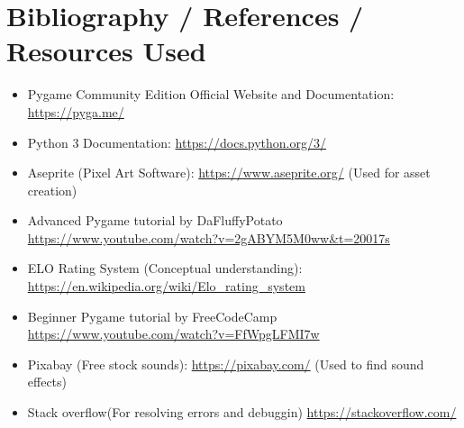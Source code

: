 \documentclass[11pt, a4paper]{article}
\begin{document}
\newpage


\section*{Bibliography / References / Resources Used}

\begin{itemize}

    \item Pygame Community Edition Official Website and Documentation: \href{https://pyga.me/}{https://pyga.me/}
    
    \item Python 3 Documentation: \href{https://docs.python.org/3/}{https://docs.python.org/3/}
    
    \item Aseprite (Pixel Art Software): \href{https://www.aseprite.org/}{https://www.aseprite.org/} (Used for asset creation)
    
    \item Advanced Pygame tutorial by DaFluffyPotato \url{https://www.youtube.com/watch?v=2gABYM5M0ww&t=20017s}
    
    \item ELO Rating System (Conceptual understanding): \href{https://en.wikipedia.org/wiki/Elo_rating_system}{https://en.wikipedia.org/wiki/Elo\_rating\_system}
        
    \item Beginner Pygame tutorial by FreeCodeCamp \url{https://www.youtube.com/watch?v=FfWpgLFMI7w}
    
    \item Pixabay (Free stock sounds): \href{https://pixabay.com/}{https://pixabay.com/} (Used to find sound effects)

    \item Stack overflow(For resolving errors and debuggin) \href{https://stackoverflow.com/}{https://stackoverflow.com/}
    
\end{itemize}
\end{document}
